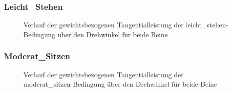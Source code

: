 \documentclass[
  letterpaper,
  DIV=11]{scrartcl}
\begin{document}
\subsubsection{Leicht\_Stehen}

\begin{figure}


\caption{\label{fig-Tangentialleistung_Leicht_Stehen}Verlauf der
gewichtsbezogenen Tangentialleistung der leicht\_stehen-Bedingung über
den Drehwinkel für beide Beine}

\end{figure}%

\subsubsection{Moderat\_Sitzen}

\begin{figure}


\caption{\label{fig-Tangentialleistung_Moderat_Sitzen}Verlauf der
gewichtsbezogenen Tangentialleistung der moderat\_sitzen-Bedingung über
den Drehwinkel für beide Beine}

\end{figure}%
\end{document}
